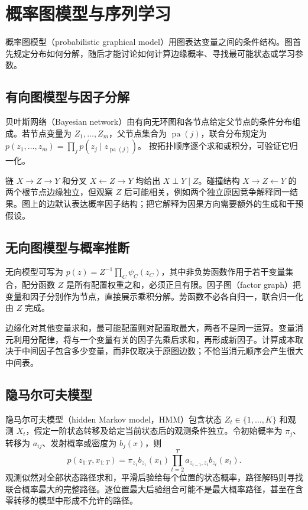 \setcounter{chapter}{18} %
\chapter{概率图模型与序列学习}
\label{chap:ml-graphical}

概率图模型（probabilistic graphical model）用图表达变量之间的条件结构。图首先规定分布如何分解，随后才能讨论如何计算边缘概率、寻找最可能状态或学习参数。

\section{有向图模型与因子分解}

贝叶斯网络（Bayesian network）由有向无环图和各节点给定父节点的条件分布组成。若节点变量为 $Z_1,\ldots,Z_m$，父节点集合为 $\operatorname{pa}(j)$，联合分布规定为
$p(z_1,\ldots,z_m)=\prod_jp(z_j\mid z_{\operatorname{pa}(j)})$。
按拓扑顺序逐个求和或积分，可验证它归一化。

链 $X\to Z\to Y$ 和分叉 $X\leftarrow Z\to Y$ 均给出 $X\perp Y\mid Z$。碰撞结构 $X\to Z\leftarrow Y$ 的两个根节点边缘独立，但观察 $Z$ 后可能相关，例如两个独立原因竞争解释同一结果。图上的边默认表达概率因子结构；把它解释为因果方向需要额外的生成和干预假设。

\section{无向图模型与概率推断}

无向模型可写为 $p(z)=Z^{-1}\prod_C\psi_C(z_C)$，其中非负势函数作用于若干变量集合，配分函数 $Z$ 是所有配置权重之和，必须正且有限。因子图（factor graph）把变量和因子分别作为节点，直接展示乘积分解。势函数不必各自归一，联合归一化由 $Z$ 完成。

边缘化对其他变量求和，最可能配置则对配置取最大，两者不是同一运算。变量消元利用分配律，将与一个变量有关的因子先乘后求和，再形成新因子。计算成本取决于中间因子包含多少变量，而非仅取决于原图边数；不恰当消元顺序会产生很大中间表。

\section{隐马尔可夫模型}

隐马尔可夫模型（hidden Markov model，HMM）包含状态 $Z_t\in\{1,\ldots,K\}$ 和观测 $X_t$，假定一阶状态转移及给定当前状态后的观测条件独立。令初始概率为 $\pi_j$、转移为 $a_{ij}$、发射概率或密度为 $b_j(x)$，则
\begin{equation}
 p(z_{1:T},x_{1:T})=\pi_{z_1}b_{z_1}(x_1)
 \prod_{t=2}^Ta_{z_{t-1},z_t}b_{z_t}(x_t).
 \label{eq:ml-hmm-joint}
\end{equation}
观测似然对全部状态路径求和，平滑后验给每个位置的状态概率，路径解码则寻找联合概率最大的完整路径。逐位置最大后验组合可能不是最大概率路径，甚至在含零转移的模型中形成不允许的路径。

